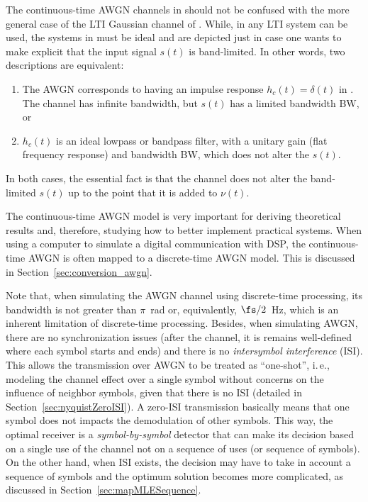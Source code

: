 The continuous-time AWGN channels in  should not be confused with the more general case of the LTI Gaussian channel of . While, in  any LTI system can be used, the systems in  must
be ideal and are depicted just in case one wants to make explicit that the input signal $s(t)$ is band-limited. In other words, two descriptions are equivalent:
\begin{enumerate}
	\item The AWGN corresponds to having an impulse response $h_c(t)=\delta(t)$ in . The channel has infinite bandwidth, but $s(t)$ has a limited bandwidth BW, or
	\item $h_c(t)$ is an ideal lowpass or bandpass filter, with a unitary gain (flat frequency response) and bandwidth BW, which does not alter the $s(t)$.
\end{enumerate}
In both cases, the essential fact is that the channel does not alter the band-limited $s(t)$ up to the point that it is added to $\nu(t)$.
 
The continuous-time AWGN model is very important for deriving theoretical results and, therefore, studying how to better implement practical systems. When using a computer to simulate a digital communication with DSP, the continuous-time AWGN is often mapped to a discrete-time AWGN model. This is discussed in Section~\ref{sec:conversion_awgn}. 

Note that, when simulating the AWGN channel using  discrete-time processing, its bandwidth is not greater than $\pi$~rad or, equivalently, $\fs/2$~Hz, which is an inherent limitation of discrete-time processing.
Besides, when simulating AWGN, there are no synchronization issues (after the channel, it is remains well-defined where each symbol starts and ends) and there is no \emph{intersymbol interference} (ISI). 
This allows the transmission over AWGN to be treated as ``one-shot'', i.\,e., modeling the channel effect over a single symbol without concerns on the influence of neighbor symbols, given that there is no ISI (detailed in Section~\ref{sec:nyquistZeroISI}). A zero-ISI transmission basically means that one symbol does not impacts the demodulation of other symbols. This way, the optimal receiver is a \emph{symbol-by-symbol} detector that can make its decision based on a single use of the channel not on a sequence of uses (or sequence of symbols). On the other hand, when ISI exists, the decision may have to take in account a sequence of symbols and the optimum solution becomes more complicated, as discussed in Section~\ref{sec:mapMLESequence}.

